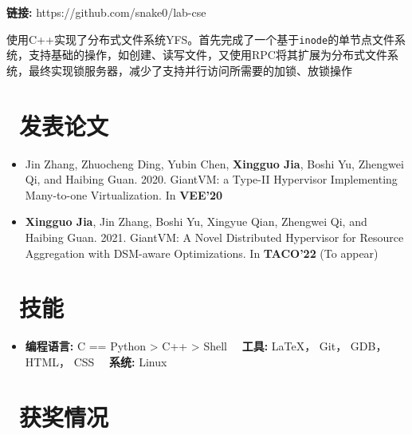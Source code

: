 \documentclass{resume}
\begin{document}
\textbf{链接:} https://github.com/snake0/lab-cse

使用C++实现了分布式文件系统YFS。首先完成了一个基于\texttt{inode}的单节点文件系统，支持基础的操作，如创建、读写文件，又使用RPC将其扩展为分布式文件系统，最终实现锁服务器，减少了支持并行访问所需要的加锁、放锁操作

\section{\faGraduationCap\ 发表论文}
\begin{itemize}
\item Jin Zhang, Zhuocheng Ding, Yubin Chen, \textbf{Xingguo Jia}, Boshi Yu, Zhengwei Qi, and Haibing Guan. 2020. GiantVM: a Type-II Hypervisor Implementing Many-to-one Virtualization. In \textbf{VEE'20}
\item \textbf{Xingguo Jia}, Jin Zhang, Boshi Yu, Xingyue Qian, Zhengwei Qi, and Haibing Guan. 2021. GiantVM: A Novel Distributed Hypervisor for Resource Aggregation with DSM-aware Optimizations. In \textbf{TACO'22} (To appear)
\end{itemize}


\section{\faCogs\ 技能}
\begin{itemize}[parsep=0.5ex]
  \item \textbf{编程语言:} C == Python > C++ > Shell \ \ \textbf{工具:} \LaTeX， Git， GDB， HTML， CSS \ \ \textbf{系统:} Linux 
\end{itemize}

\section{\faHeartO\ 获奖情况}

%
%
\end{document}
